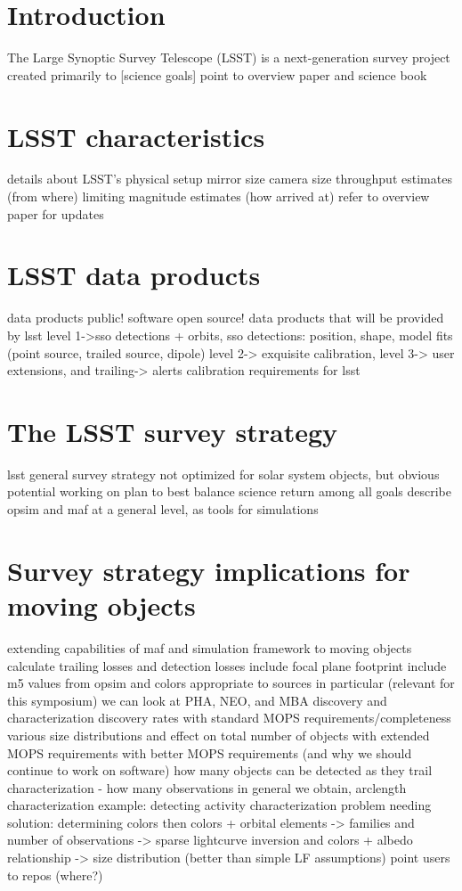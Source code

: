 \documentclass{iau}
\begin{document}
\section{Introduction}

The Large Synoptic Survey Telescope (LSST) is a next-generation survey
project created primarily to [science goals]
point to overview paper and science book

\section{LSST characteristics}
details about LSST's physical setup
mirror size
camera size
throughput estimates (from where)
limiting magnitude estimates (how arrived at)
refer to overview paper for updates

\section{LSST data products}
data products public! software open source!
data products that will be provided by lsst
level 1->sso detections + orbits,
  sso detections: position, shape, model fits (point source, trailed
  source, dipole)
level 2-> exquisite calibration, 
level 3-> user extensions, 
and trailing-> alerts
calibration requirements for lsst

\section{The LSST survey strategy}
lsst general survey strategy
not optimized for solar system objects, but obvious potential
working on plan to best balance science return among all goals
describe opsim and maf at a general level, as tools for simulations

\section{Survey strategy implications for moving objects}
extending capabilities of maf and simulation framework to moving
objects
calculate trailing losses and detection losses
include focal plane footprint
include m5 values from opsim and colors appropriate to sources
in particular (relevant for this symposium) we can look at PHA, NEO,
and MBA discovery and characterization
discovery rates with standard MOPS requirements/completeness
 various size distributions and effect on total number of objects
with extended MOPS requirements
with better MOPS requirements (and why we should continue to work on software)
how many objects can be detected as they trail
characterization - how many observations in general we obtain,
arclength
characterization example: detecting activity
characterization problem needing solution: determining colors
then colors + orbital elements -> families
and number of observations -> sparse lightcurve inversion
and colors + albedo relationship -> size distribution (better than
simple LF assumptions)
point users to repos (where?)
\end{document}
